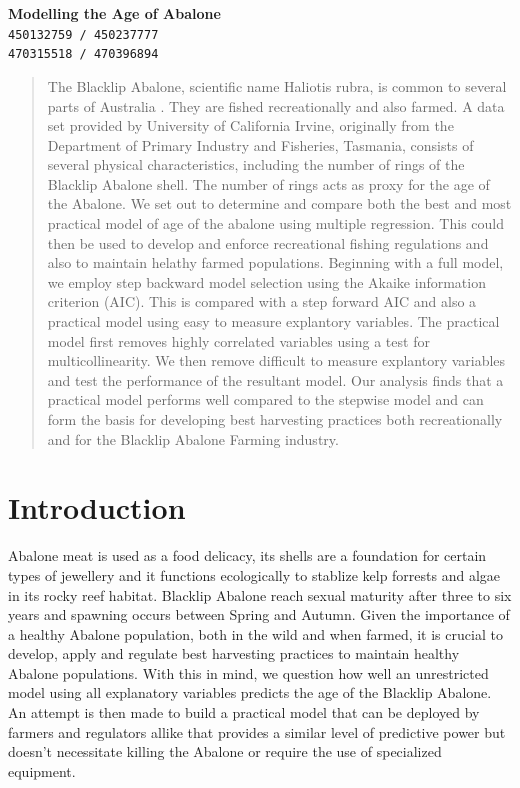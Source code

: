 \documentclass[10pt,twocolumn]{article}
\begin{document}
	\begin{center}
		\textbf{\Large Modelling the Age of Abalone} \\\vspace{4mm}
		\texttt{450132759 / 450237777\\470315518 / 470396894}
	\end{center}
	\begin{abstract}
		The Blacklip Abalone, scientific name Haliotis rubra, is common to several parts of Australia \cite{source}. They are fished recreationally and also farmed. A data set provided by University of California Irvine, originally from the Department of Primary Industry and Fisheries, Tasmania, consists of several physical characteristics, including the number of rings of the Blacklip Abalone shell. The number of rings acts as proxy for the age of the Abalone. We set out to determine and compare both the best and most practical model of age of the abalone using multiple regression. This could then be used to develop and enforce recreational fishing regulations and also to maintain helathy farmed populations. Beginning with a full model, we employ step backward model selection using the Akaike information criterion (AIC). This is compared with a step forward AIC and also a practical model using easy to measure explantory variables. The practical model first removes highly correlated variables using a test for multicollinearity. We then remove difficult to measure explantory variables and test the performance of the resultant model. Our analysis finds that a practical model performs well compared to the stepwise model and can form the basis for developing best harvesting practices both recreationally and for the Blacklip Abalone Farming industry.
	\end{abstract}

	\section{Introduction}
		Abalone meat is used as a food delicacy, its shells are a foundation for certain types of jewellery and it functions ecologically to stablize kelp forrests and algae in its rocky reef habitat. Blacklip Abalone reach sexual maturity after three to six years and spawning occurs between Spring and Autumn\cite{blacklip}. Given the importance of a healthy Abalone population, both in the wild and when farmed, it is crucial to develop, apply and regulate best harvesting practices to maintain healthy Abalone populations. With this in mind, we question how well an unrestricted model using all explanatory variables predicts the age of the Blacklip Abalone. An attempt is then made to build a practical model that can be deployed by farmers and regulators allike that provides a similar level of predictive power but doesn't necessitate killing the Abalone or require the use of specialized equipment.					
\end{document}
